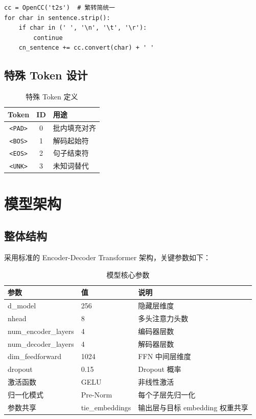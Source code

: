 \documentclass[12pt, a4paper]{ctexart}
\begin{document}
\begin{lstlisting}[style=python, caption={字符级中文分词核心代码}]
cc = OpenCC('t2s')  # 繁转简统一
for char in sentence.strip():
    if char in (' ', '\n', '\t', '\r'):
        continue
    cn_sentence += cc.convert(char) + ' '
\end{lstlisting}

\subsection{特殊 Token 设计}

\begin{table}[H]
\centering
\caption{特殊 Token 定义}
\begin{tabular}{ccl}
\toprule
\textbf{Token} & \textbf{ID} & \textbf{用途} \\
\midrule
\texttt{<PAD>} & 0 & 批内填充对齐 \\
\texttt{<BOS>} & 1 & 解码起始符 \\
\texttt{<EOS>} & 2 & 句子结束符 \\
\texttt{<UNK>} & 3 & 未知词替代 \\
\bottomrule
\end{tabular}
\end{table}

\section{模型架构}

\subsection{整体结构}

采用标准的 Encoder-Decoder Transformer 架构\cite{vaswani2017}，关键参数如下：

\begin{table}[H]
\centering
\caption{模型核心参数}
\begin{tabular}{lll}
\toprule
\textbf{参数} & \textbf{值} & \textbf{说明} \\
\midrule
d\_model              & 256   & 隐藏层维度 \\
nhead                 & 8     & 多头注意力头数 \\
num\_encoder\_layers   & 4     & 编码器层数 \\
num\_decoder\_layers   & 4     & 解码器层数 \\
dim\_feedforward       & 1024  & FFN 中间层维度 \\
dropout               & 0.15  & Dropout 概率 \\
激活函数              & GELU  & 非线性激活 \\
归一化模式            & Pre-Norm & 每个子层先归一化 \\
参数共享              & tie\_embeddings & 输出层与目标 embedding 权重共享 \\
\bottomrule
\end{tabular}
\end{table}
\end{document}
